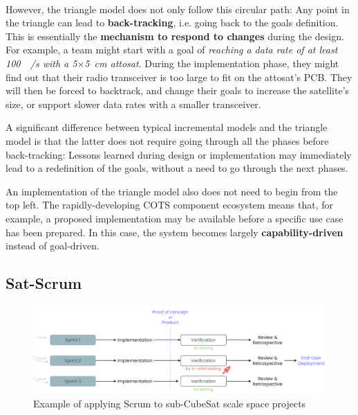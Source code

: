 \documentclass[]{iac}
\begin{document}
\paragraph{}
However, the triangle model does not only follow this circular path: Any point in the triangle can lead to \textbf{back-tracking}, i.e. going back to the goals definition. This is essentially the \textbf{mechanism to respond to changes} during the design. For example, a team might start with a goal of \emph{reaching a data rate of at least \SI{100}{\kilo\bit/\second} with a \SI{5}{}\(\times\)\SI{5}{\centi\meter} attosat}. During the implementation phase, they might find out that their radio transceiver is too large to fit on the attosat's PCB.
They will then be forced to backtrack, and change their goals to increase the satellite's size, or support slower data rates with a smaller transceiver.

A significant difference between typical incremental models \autocite{sebok} and the triangle model is that the latter does not require going through all the phases before back-tracking: Lessons learned during design or implementation may immediately lead to a redefinition of the goals, without a need to go through the next phases.

An implementation of the triangle model also does not need to begin from the top left. The rapidly-developing COTS component ecosystem means that, for example, a proposed implementation may be available before a specific use case has been prepared. In this case, the system becomes largely \textbf{capability-driven} instead of goal-driven.

\subsection{Sat-Scrum}
\label{sec:sat_scrum}

\begin{figure}
    \centering
    \includegraphics[width=\linewidth]{media/Scrum.drawio-2.pdf}
    \caption{Example of applying Scrum to sub-CubeSat scale space projects}
    \label{fig:scrum}
\end{figure}
\end{document}
